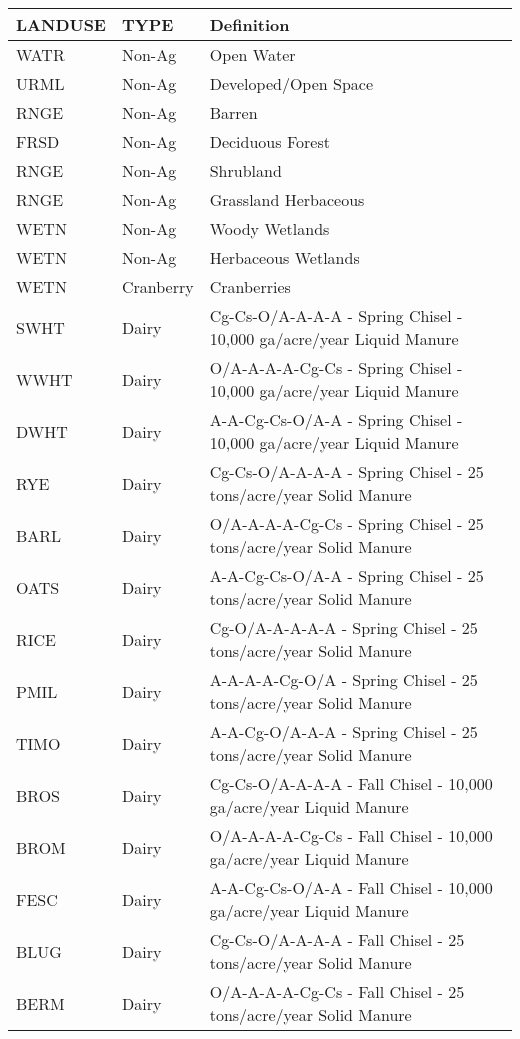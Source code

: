 \begin{longtable}{lll}
  \hline
LANDUSE & TYPE & Definition \\ 
  \hline
WATR & Non-Ag & Open Water \\ 
  URML & Non-Ag & Developed/Open Space \\ 
  RNGE & Non-Ag & Barren \\ 
  FRSD & Non-Ag & Deciduous Forest \\ 
  RNGE & Non-Ag & Shrubland \\ 
  RNGE & Non-Ag & Grassland Herbaceous \\ 
  WETN & Non-Ag & Woody Wetlands \\ 
  WETN & Non-Ag & Herbaceous Wetlands \\ 
  WETN & Cranberry & Cranberries \\ 
  SWHT & Dairy & Cg-Cs-O/A-A-A-A - Spring Chisel - 10,000 ga/acre/year Liquid Manure \\ 
  WWHT & Dairy & O/A-A-A-A-Cg-Cs - Spring Chisel - 10,000 ga/acre/year Liquid Manure \\ 
  DWHT & Dairy & A-A-Cg-Cs-O/A-A - Spring Chisel - 10,000 ga/acre/year Liquid Manure \\ 
  RYE & Dairy & Cg-Cs-O/A-A-A-A - Spring Chisel - 25 tons/acre/year Solid Manure \\ 
  BARL & Dairy & O/A-A-A-A-Cg-Cs - Spring Chisel - 25 tons/acre/year Solid Manure \\ 
  OATS & Dairy & A-A-Cg-Cs-O/A-A - Spring Chisel - 25 tons/acre/year Solid Manure \\ 
  RICE & Dairy & Cg-O/A-A-A-A-A - Spring Chisel - 25 tons/acre/year Solid Manure \\ 
  PMIL & Dairy & A-A-A-A-Cg-O/A - Spring Chisel - 25 tons/acre/year Solid Manure \\ 
  TIMO & Dairy & A-A-Cg-O/A-A-A - Spring Chisel - 25 tons/acre/year Solid Manure \\ 
  BROS & Dairy & Cg-Cs-O/A-A-A-A - Fall Chisel - 10,000 ga/acre/year Liquid Manure \\ 
  BROM & Dairy & O/A-A-A-A-Cg-Cs - Fall Chisel - 10,000 ga/acre/year Liquid Manure \\ 
  FESC & Dairy & A-A-Cg-Cs-O/A-A - Fall Chisel - 10,000 ga/acre/year Liquid Manure \\ 
  BLUG & Dairy & Cg-Cs-O/A-A-A-A - Fall Chisel - 25 tons/acre/year Solid Manure \\ 
  BERM & Dairy & O/A-A-A-A-Cg-Cs - Fall Chisel - 25 tons/acre/year Solid Manure \\ 

\end{longtable}
